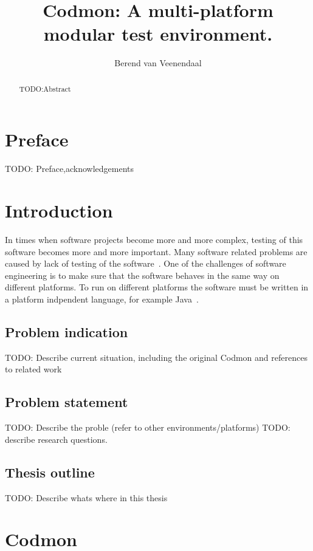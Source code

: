 \documentclass[a4paper,10pt]{scrartcl}
\title{Codmon: A multi-platform modular test environment.}
\author{Berend van Veenendaal}
\begin{document}
\maketitle

\begin{abstract}
TODO:Abstract
\end{abstract}
\newpage
\section*{Preface}
\label{sec:Preface}
TODO: Preface,acknowledgements
\newpage
\tableofcontents
\newpage

\section{Introduction}
\label{sec:Introduction}
In times when software projects become more and more complex, testing of this software becomes more and more important. Many software
related problems are caused by lack of testing of the software~\cite{TTCST}. One of the challenges of software engineering is to make
sure that the software behaves in the same way on different platforms. To run on different platforms the software must be written in a
platform indpendent language, for example Java~\cite{Java}.

\subsection{Problem indication}
\label{subsec:Problemindication}
TODO: Describe current situation, including the original Codmon and references to related work

\subsection{Problem statement}
\label{subsec:Problemstatement}
TODO: Describe the proble (refer to other environments/platforms)
TODO: describe research questions.

\subsection{Thesis outline}
\label{subsec:Thesisoutline}
TODO: Describe whats where in this thesis

\newpage

\section{Codmon}
\label{sec:codmon}
\end{document}
